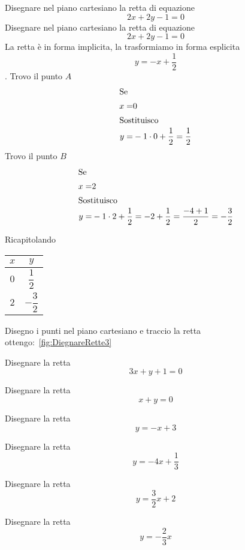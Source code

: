 \begin{exercise}
	Disegnare nel piano cartesiano la retta di equazione  \[2x+2y-1=0\]
	\tcblower
	Disegnare nel piano cartesiano la retta di equazione \[2x+2y-1=0\]
	La retta è in forma implicita, la trasformiamo in forma esplicita\[y=-x+\dfrac{1}{2}\].
	Trovo il punto $A$ 
	\begin{align*}
		\intertext{Se}
		x=&0\\
		\intertext{Sostituisco}
		y=&-1\cdot 0+\dfrac{1}{2}=\dfrac{1}{2}
	\end{align*}
	Trovo il punto $B$ 
	\begin{align*}
		\intertext{Se}
		x=&2\\
		\intertext{Sostituisco}
			y=&-1\cdot 2+\dfrac{1}{2}=-2+\dfrac{1}{2}=\dfrac{-4+1}{2}=-\dfrac{3}{2}
	\end{align*}
	
	Ricapitolando
	\begin{center}
		\begin{tabular}{c|c}
			$x$&$y$  \\
			\hline
			$0$&$\dfrac{1}{2}$  \\
			$2$&$-\dfrac{3}{2}$ 
		\end{tabular}
	\end{center}
	Disegno i punti nel  piano cartesiano e traccio la retta ottengo:~\vref{fig:DiegnareRette3}
	\begin{center}
		
		\label{fig:DiegnareRette3}
	\end{center}
\end{exercise}
\begin{exercise}[no solution]
Disegnare la retta \[3x+y+1=0\]
\end{exercise}
\begin{exercise}[no solution]
	Disegnare la retta \[x+y=0\]
\end{exercise}
\begin{exercise}[no solution]
	Disegnare la retta \[y=-x+3\]
\end{exercise}
\begin{exercise}[no solution]
	Disegnare la retta \[y=-4x+\dfrac{1}{3}\]
\end{exercise}
\begin{exercise}[no solution]
	Disegnare la retta \[y=\dfrac{3}{2}x+2\]
\end{exercise}
\begin{exercise}[no solution]
	Disegnare la retta \[y=-\dfrac{2}{3}x\]
\end{exercise}